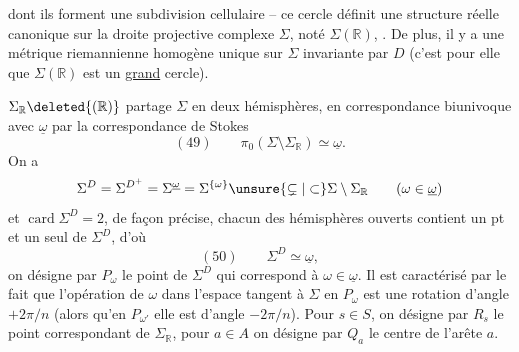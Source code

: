 dont ils forment une subdivision cellulaire -- ce cercle définit une structure réelle canonique sur la droite projective complexe $\Sigma$, noté $\Sigma(\mathbb R)$, . De plus, il y a une métrique riemannienne homogène unique  sur $\Sigma$ invariante par $D$ (c'est pour elle que $\Sigma(\mathbb R)$ est un \uline{grand} cercle).

$\Sigma_{\mathbb R}\deleted{(\mathbb R)}$ partage $\Sigma$ en deux hémisphères,  en correspondance biunivoque avec $\underline\omega$ par la correspondance de Stokes
\[
(49)\qquad \pi_0(\Sigma\setminus\Sigma_{\mathbb R})\simeq\underline\omega.
\]
On a
\[
\Sigma^D=\Sigma^{D^+}=\Sigma^{\underline\omega}=\Sigma^{\{\omega\}}\unsure{\subsetneq|\subset}\Sigma\setminus\Sigma_{\mathbb R}
\qquad(\omega\in\underline\omega)
\]
et $\operatorname{card}\Sigma^D=2$, de façon précise, chacun des hémisphères ouverts contient un pt et un seul de $\Sigma^D$, d'où
\[
(50)\qquad \Sigma^D\simeq\underline\omega,
\]
on désigne par $P_\omega$ le point de $\Sigma^D$ qui correspond à $\omega\in\underline\omega$. Il est caractérisé par le fait que l'opération de $\omega$ dans l'espace tangent à $\Sigma$ en $P_\omega$ est une rotation d'angle $+2\pi/n$ (alors qu'en $P_{\omega'}$ elle est d'angle $-2\pi/n$). Pour $s\in S$, on désigne par $R_s$ le point correspondant de $\Sigma_{\mathbb R}$, pour $a\in A$ on désigne par $Q_a$ le centre de l'arête $a$.
